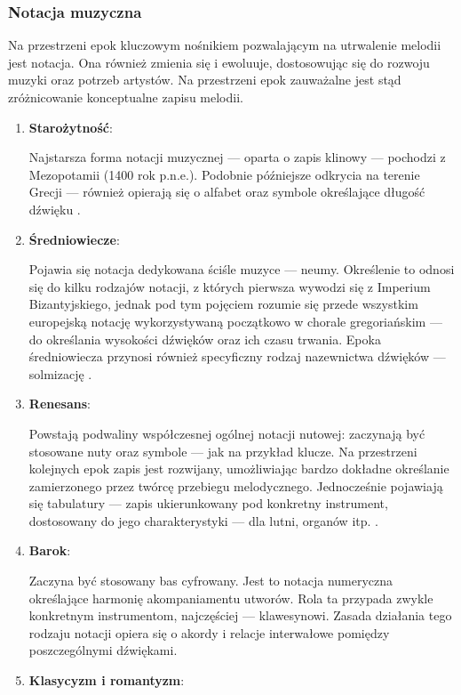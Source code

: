 \subsubsection{Notacja muzyczna}
Na przestrzeni epok kluczowym nośnikiem pozwalającym na utrwalenie melodii jest notacja.
Ona również zmienia się i ewoluuje, dostosowując się do rozwoju muzyki oraz potrzeb artystów.
Na przestrzeni epok zauważalne jest stąd zróżnicowanie konceptualne zapisu melodii.
\begin{enumerate}
	\item \textbf{Starożytność}:

	      Najstarsza forma notacji muzycznej — oparta o zapis klinowy — pochodzi z Mezopotamii (1400 rok p.n.e.).
	      Podobnie późniejsze odkrycia na terenie Grecji — również opierają się o alfabet
	      oraz symbole określające długość dźwięku \cite{atlas1}.
	\item \textbf{Średniowiecze}:

	      Pojawia się notacja dedykowana ściśle muzyce — neumy. Określenie to odnosi się do kilku rodzajów notacji, z których pierwsza wywodzi
	      się z Imperium Bizantyjskiego, jednak pod tym pojęciem rozumie się przede wszystkim europejską notację wykorzystywaną początkowo w chorale
	      gregoriańskim — do określania wysokości dźwięków oraz ich czasu trwania.
	      Epoka średniowiecza przynosi również specyficzny rodzaj nazewnictwa dźwięków — solmizację \cite{abc}.
	\item \textbf{Renesans}:

	      Powstają podwaliny współczesnej ogólnej notacji nutowej: zaczynają być stosowane nuty oraz symbole
	      — jak na przykład klucze.
	      Na przestrzeni kolejnych epok zapis jest rozwijany, umożliwiając bardzo dokładne określanie zamierzonego przez twórcę przebiegu
	      melodycznego.
	      Jednocześnie pojawiają się tabulatury — zapis ukierunkowany pod konkretny instrument, dostosowany do jego charakterystyki —
	      dla lutni, organów itp. \cite{atlas1}.
	\item \textbf{Barok}:

	      Zaczyna być stosowany bas cyfrowany.
	      Jest to notacja numeryczna określające harmonię akompaniamentu utworów.
	      Rola ta przypada zwykle konkretnym instrumentom, najczęściej — klawesynowi.
	      Zasada działania tego rodzaju notacji opiera się o akordy i relacje interwałowe pomiędzy poszczególnymi dźwiękami.
	\item \textbf{Klasycyzm i romantyzm}:


\end{enumerate}
